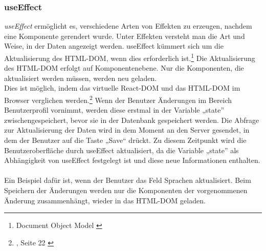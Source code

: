 \subsubsection*{useEffect}
\textit{useEffect} ermöglicht es, verschiedene Arten von Effekten zu erzeugen, nachdem eine Komponente gerendert wurde. Unter Effekten versteht man die Art und Weise, in der Daten angezeigt werden. useEffect kümmert sich um die Aktualisierung des HTML-DOM, wenn dies erforderlich ist.\footnote{Document Object Model {\cite{MO2}}} Die Aktualisierung des HTML-DOM erfolgt auf Komponentenebene. Nur die Komponenten, die aktualisiert werden müssen, werden neu geladen.\\
Dies ist möglich, indem  das virtuelle React-DOM und das HTML-DOM im Browser verglichen werden\cite{R06}.\footnote{{, Seite 22 \cite{AN1}}} Wenn der Benutzer Änderungen im Bereich Benutzerprofil vornimmt, werden diese erstmal in der Variable „state” zwischengespeichert, bevor sie in der Datenbank gespeichert werden. Die Abfrage zur Aktualisierung der Daten wird in dem Moment an den Server gesendet, in dem der Benutzer auf die Taste „Save“ drückt. Zu diesem Zeitpunkt wird die Benutzeroberfläche durch useEffect aktualisiert, da die Variable „state” als Abhängigkeit von useEffect festgelegt ist und diese neue Informationen enthalten.
\\\\
Ein Beispiel dafür ist, wenn der Benutzer das Feld Sprachen aktualisiert. Beim Speichern der Änderungen werden nur die Komponenten der vorgenommenen Änderung zusammenhängt, wieder in das HTML-DOM geladen.

